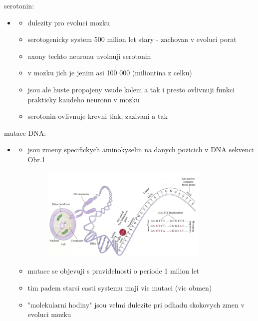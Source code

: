\documentclass[journal,onecolumn]{IEEEtrancz}
\begin{document}
\begin{itemize}
\begin{itemize}
\begin{itemize}
\begin{itemize}
					\vspace{3mm}
					\vspace{3mm}
			\end{itemize}
		\end{itemize}
	\end{itemize}
\end{itemize}
serotonin:
\begin{itemize}
	\item 
	\begin{itemize}
		\item dulezity pro evoluci mozku
		\item serotogenicky system 500 milion let stary - zachovan v evoluci porat
			\vspace{3mm}
		\item axony techto neuronu uvolnuji serotonin
		\item v mozku jich je jenim asi 100 000 (miliontina z celku)
		\item jsou ale huste propojeny vsude kolem a tak i presto ovlivnuji funkci prakticky kaudeho neuronu v mozku
			\vspace{3mm}
		\item serotonin ovlivnuje krevni tlak, zazivani a tak
			\vspace{3mm}
	\end{itemize}
\end{itemize}
mutace DNA:
\begin{itemize}
	\item 
	\begin{itemize}
		\item jsou zmeny specifickych aminokyselin na danych pozicich v DNA sekvenci Obr.\ref{chrom} 

		\begin{figure}[ht]
			\centering
				\includegraphics[width=8.0cm]{fig/chrom.png}
			\caption{ }
			\label{chrom}
		\end{figure}

		\item mutace se objevuji s pravidelnosti o periode 1 milion let
		\item tim padem starsi casti systemu maji vic mutaci (vic obmen)
			\vspace{3mm}
		\item "molekularni hodiny" jsou velmi dulezite pri odhadu skokovych zmen v evoluci mozku
			\vspace{3mm}
			\vspace{3mm}
	\end{itemize}
\end{itemize}
\end{document}
